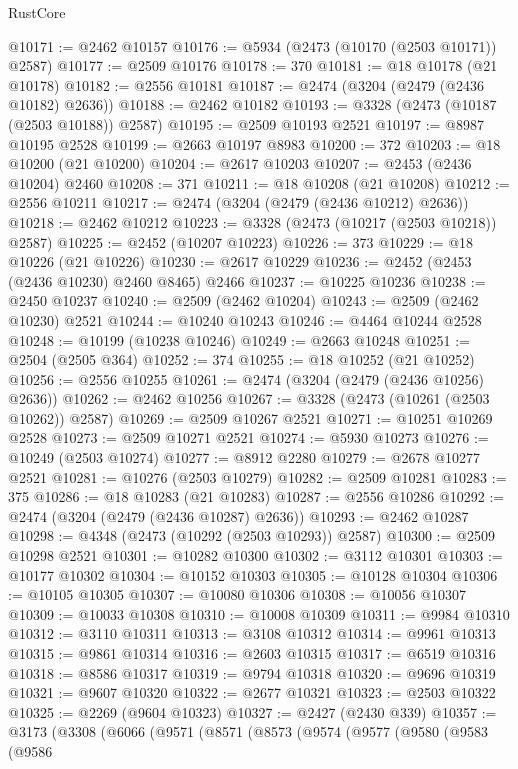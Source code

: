 \begin{lexlean}{RustCore}
\begin{coremodule}
@10171 := @2462 @10157
@10176 := @5934 (@2473 (@10170 (@2503 @10171)) @2587)
@10177 := @2509 @10176
@10178 := 370
@10181 := @18 @10178 (@21 @10178)
@10182 := @2556 @10181
@10187 := @2474 (@3204 (@2479 (@2436 @10182) @2636))
@10188 := @2462 @10182
@10193 := @3328 (@2473 (@10187 (@2503 @10188)) @2587)
@10195 := @2509 @10193 @2521
@10197 := @8987 @10195 @2528
@10199 := @2663 @10197 @8983
@10200 := 372
@10203 := @18 @10200 (@21 @10200)
@10204 := @2617 @10203
@10207 := @2453 (@2436 @10204) @2460
@10208 := 371
@10211 := @18 @10208 (@21 @10208)
@10212 := @2556 @10211
@10217 := @2474 (@3204 (@2479 (@2436 @10212) @2636))
@10218 := @2462 @10212
@10223 := @3328 (@2473 (@10217 (@2503 @10218)) @2587)
@10225 := @2452 (@10207 @10223)
@10226 := 373
@10229 := @18 @10226 (@21 @10226)
@10230 := @2617 @10229
@10236 := @2452 (@2453 (@2436 @10230) @2460 @8465) @2466
@10237 := @10225 @10236
@10238 := @2450 @10237
@10240 := @2509 (@2462 @10204)
@10243 := @2509 (@2462 @10230) @2521
@10244 := @10240 @10243
@10246 := @4464 @10244 @2528
@10248 := @10199 (@10238 @10246)
@10249 := @2663 @10248
@10251 := @2504 (@2505 @364)
@10252 := 374
@10255 := @18 @10252 (@21 @10252)
@10256 := @2556 @10255
@10261 := @2474 (@3204 (@2479 (@2436 @10256) @2636))
@10262 := @2462 @10256
@10267 := @3328 (@2473 (@10261 (@2503 @10262)) @2587)
@10269 := @2509 @10267 @2521
@10271 := @10251 @10269 @2528
@10273 := @2509 @10271 @2521
@10274 := @5930 @10273
@10276 := @10249 (@2503 @10274)
@10277 := @8912 @2280
@10279 := @2678 @10277 @2521
@10281 := @10276 (@2503 @10279)
@10282 := @2509 @10281
@10283 := 375
@10286 := @18 @10283 (@21 @10283)
@10287 := @2556 @10286
@10292 := @2474 (@3204 (@2479 (@2436 @10287) @2636))
@10293 := @2462 @10287
@10298 := @4348 (@2473 (@10292 (@2503 @10293)) @2587)
@10300 := @2509 @10298 @2521
@10301 := @10282 @10300
@10302 := @3112 @10301
@10303 := @10177 @10302
@10304 := @10152 @10303
@10305 := @10128 @10304
@10306 := @10105 @10305
@10307 := @10080 @10306
@10308 := @10056 @10307
@10309 := @10033 @10308
@10310 := @10008 @10309
@10311 := @9984 @10310
@10312 := @3110 @10311
@10313 := @3108 @10312
@10314 := @9961 @10313
@10315 := @9861 @10314
@10316 := @2603 @10315
@10317 := @6519 @10316
@10318 := @8586 @10317
@10319 := @9794 @10318
@10320 := @9696 @10319
@10321 := @9607 @10320
@10322 := @2677 @10321
@10323 := @2503 @10322
@10325 := @2269 (@9604 @10323)
@10327 := @2427 (@2430 @339)
@10357 := @3173
    (@3308
      (@6066
        (@9571
          (@8571
            (@8573
              (@9574
                (@9577
                  (@9580
                    (@9583
                      (@9586

\end{coremodule}
\end{lexlean}
